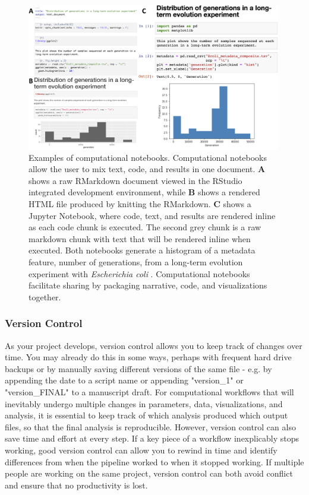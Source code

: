 \documentclass[10pt,letterpaper]{article}
\begin{document}
\begin{figure}
\includegraphics[width=0.99\textwidth]{figures/nb_figure.png}
\caption{Examples of computational notebooks. Computational notebooks allow the user to mix text, code, and results in one document. \textbf{A} shows a raw RMarkdown document viewed in the RStudio integrated development environment, while \textbf{B} shows a rendered HTML file produced by knitting the RMarkdown. \textbf{C} shows a Jupyter Notebook, where code, text, and results are rendered inline as each code chunk is executed. The second grey chunk is a raw markdown chunk with text that will be rendered inline when executed. Both notebooks generate a histogram of a metadata feature, number of generations, from a long-term evolution experiment with \textit{Escherichia coli} \cite{tenaillon2016tempo}. Computational notebooks facilitate sharing by packaging narrative, code, and visualizations together.} 
\label{fig:nb_figure}
\end{figure}

 
\subsubsection*{Version Control} 

As your project develops, version control allows you to keep track of changes over time. 
You may already do this in some ways, perhaps with frequent hard drive backups or by manually saving different versions of the same file  - e.g. by appending the date to a script name or appending "version\_1" or "version\_FINAL" to a manuscript draft. 
For computational workflows that will inevitably undergo multiple changes in parameters, data, visualizations, and analysis, it is essential to keep track of which analysis produced which output files, so that the final analysis is reproducible. 
However, version control can also save time and effort at every step. 
If a key piece of a workflow inexplicably stops working, good version control can allow you to rewind in time and identify differences from when the pipeline worked to when it stopped working. 
If multiple people are working on the same project, version control can both avoid conflict and ensure that no productivity is lost. 
\end{document}
